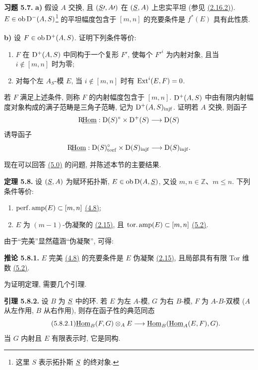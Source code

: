 \textbf{习题 5.7.} \textbf{a)} 假设 \(A\) 交换, 且 \((\underline S\prime,A\prime)\) 在 \((\underline S,A)\) 上忠实平坦 (参见 \hyperlink{sga6.e01.exercise.2-16-2}{(2.16.2)}). \(E\in\operatorname{ob}\mathrm D^-(A,S)\)\footnote{这里 \(S\) 表示拓扑斯 \(\underline S\) 的终对象.} 的平坦幅度包含于 \([m,n]\) 的充要条件是 \(f^*(E)\) 具有此性质.

\textbf{b)} 设 \(F\in\operatorname{ob}\mathrm D^+(A,S)\)\textsuperscript{\thefootnote}. 证明下列条件等价:
\begin{enumerate}[label=(\roman*)]
\item \(F\) 在 \(\mathrm D^+(A,S)\) 中同构于一个复形 \(F'\), 使每个 \(F'^i\) 为内射对象, 且当 \(i\notin[m,n]\) 时为零;
\item 对每个左 \(A_S\)-模 \(E\), 当 \(i\notin[m,n]\) 时有 \(\operatorname{Ext}^i(E,F)=0\).
\end{enumerate}
若 \(F\) 满足上述条件, 则称 \(F\) 的内射幅度包含于 \([m,n]\). \(\mathrm D^+(A,S)\) 中由有限内射幅度对象构成的满子范畴是三角子范畴, 记为 \(\mathrm D^+(A,S)_{\operatorname{injf}}\). 证明若 \(A\) 交换, 则函子
\[
  \mathrm R\!\underline{\operatorname{Hom}}:\mathrm D(S)^\circ\times\mathrm D^+(S)\longrightarrow \mathrm D(S)
\]
诱导函子
\[
  \mathrm R\!\underline{\operatorname{Hom}}:\mathrm D(S)^\circ_{\operatorname{torf}}\times\mathrm D(S)_{\operatorname{injf}}
  \longrightarrow \mathrm D(S)_{\operatorname{injf}}.
\]

现在可以回答 \hyperlink{sga6.e01.para.5-0}{(5.0)} 的问题, 并陈述本节的主要结果.

\textbf{定理 5.8.} 设 \((\underline S,A)\) 为赋环拓扑斯, \(E\in\operatorname{ob}\mathrm D(A,\underline S)\), 又设 \(m,n\in\mathbb Z\)、\(m\leq n\). 下列条件等价:
\begin{enumerate}[label=(\roman*)]
\item \(\operatorname{perf.amp}(E)\subset[m,n]\) \hyperlink{sga6.e01.ex.4-8}{(4.8)};
\item \(E\) 为 \((m-1)\)-伪凝聚的 \hyperlink{sga6.e01.ex.2-15}{(2.15)}, 且 \(\operatorname{tor.amp}(E)\subset[m,n]\) \hyperlink{sga6.e01.def.5-2}{(5.2)}.
\end{enumerate}
由于“完美”显然蕴涵“伪凝聚”, 可得:

\textbf{推论 5.8.1.} \(E\) 完美 \hyperlink{sga6.e01.ex.4-8}{(4.8)} 的充要条件是 \(E\) 伪凝聚 \hyperlink{sga6.e01.ex.2-15}{(2.15)}, 且局部具有有限 Tor 维数 \hyperlink{sga6.e01.def.5-2}{(5.2)}.

为证明定理, 需要几个引理.

\textbf{引理 5.8.2.} 设 \(B\) 为 \(\underline S\) 中的环. 若 \(E\) 为左 \(A\)-模, \(G\) 为右 \(B\)-模, \(F\) 为 \(A\)-\(B\)-双模 (\(A\) 从左作用, \(B\) 从右作用), 则存在函子性的典范同态
\begin{equation}\tag{5.8.2.1}
  \underline{\operatorname{Hom}}_B(F,G)\otimes_A E
  \longrightarrow
  \underline{\operatorname{Hom}}_B(\underline{\operatorname{Hom}}_A(E,F),G).
\end{equation}
当 \(G\) 内射且 \(E\) 有限表示时, 它是同构.

